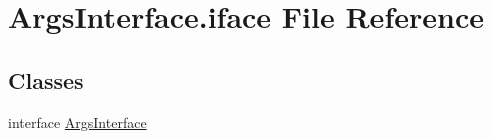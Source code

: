 \hypertarget{ArgsInterface_8iface}{\section{Args\-Interface.\-iface File Reference}
\label{ArgsInterface_8iface}
}
\subsection*{Classes}
\begin{DoxyCompactItemize}
\item 
interface \hyperlink{interfaceArgsInterface}{Args\-Interface}
\end{DoxyCompactItemize}
